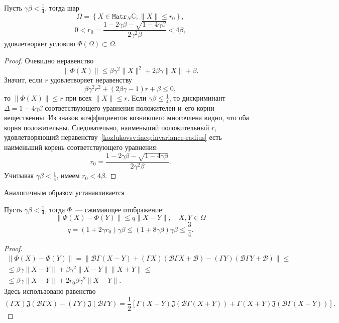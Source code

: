 \begin{lem}
    Пусть \( \gamma\beta < \frac14\),
    тогда шар
    \[
        \Omega = \left\{ X\in \mathtt{Matr}_N\mathbb{C}; \|X\| \leq r_0 \right\}, \]
    \[  0 < r_0 = \frac{1 - 2\gamma\beta - \sqrt{1-4\gamma\beta}}{2\gamma^2\beta} < 4\beta, \]
    удовлетворяет условию \( \Phi(\Omega)\subset\Omega \).
\end{lem}
\begin{proof}
Очевидно неравенство
    \[ \| \Phi(X) \| \leq
     \beta \gamma^2 \|X\|^2 + 2\beta\gamma\|X\| + \beta. \]
Значит, если \( r \) удовлетворяет неравенству
    \begin{equation}\label{kozlukovsv:ineq:invariance-radius}
        \beta \gamma^2 r^2 + (2\beta\gamma - 1)r + \beta \leq 0,
    \end{equation}
    то \( \|\Phi(X)\| \leq r \) при всех \( \|X\| \leq r \).
Если \( \gamma\beta \leq \frac14 \),
    то дискриминант \( \Delta = 1-4\gamma\beta \)
    соответствующего уравнения положителен и~его корни вещественны.
Из знаков коэффициентов возникшего многочлена видно, что оба корня положительны.
Следовательно, наименьший положительный \( r \),
    удовлетворяющий неравенству~\eqref{kozlukovsv:ineq:invariance-radius}
    есть наименьший корень
    соответствующего уравнения:
    \[ r_0 = \frac{1 - 2\gamma\beta - \sqrt{1-4\gamma\beta}}{2\gamma^2\beta}. \]
Учитывая \( \gamma\beta<\frac14 \), имеем \( r_0 < 4\beta \).
\end{proof}

Аналогичным образом устанавливается
\begin{lem}
    Пусть \(\gamma\beta<\frac14\),
    тогда \( \Phi \)~--- сжимающее отображение:
    \[ \| \Phi(X) - \Phi(Y) \| \leq q \|X - Y\|, \quad X,Y\in\Omega \]
    \[ q = (1+2\gamma r_0) \gamma\beta \leq (1+8\gamma\beta)\gamma\beta \leq \frac34. \]
\end{lem}
\begin{proof}
    \begin{align*} \| \Phi(X) - \Phi(Y) \| = \| \mathcal{B}\Gamma (X-Y) + (\Gamma X)(\mathcal{B}\Gamma X + \mathcal{B})
     - (\Gamma Y)(\mathcal{B} \Gamma Y + \mathcal{B}) \| \leq \\
        \leq
     \beta\gamma\|X-Y\| +
     \beta \gamma^2 \|X-Y\| \|X+Y\| \leq \\
        \leq
     \beta\gamma\|X-Y\| +
     2 r_0 \beta \gamma^2 \|X-Y\|.
    \end{align*}
Здесь использовано равенство
\[ (\Gamma X) \mathfrak{J}(\mathcal{B}\Gamma X) - (\Gamma Y) \mathfrak{J}(\mathcal{B}\Gamma Y) =
    \frac12\left[
        \Gamma(X-Y) \mathfrak{J}(\mathcal{B}\Gamma(X+Y))
    +   \Gamma(X+Y) \mathfrak{J}(\mathcal{B}\Gamma(X-Y))
    \right]. \]
\end{proof}

